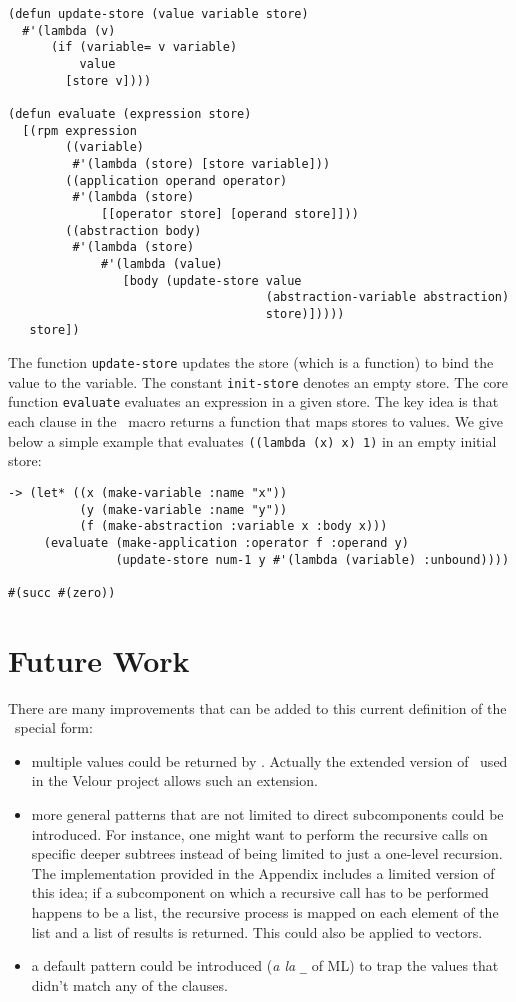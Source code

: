 \begin{sloppypar}
\begin{verbatim}
(defun update-store (value variable store)
  #'(lambda (v)
      (if (variable= v variable)
          value
        [store v])))

(defun evaluate (expression store)
  [(rpm expression
        ((variable)
         #'(lambda (store) [store variable]))
        ((application operand operator)
         #'(lambda (store)
             [[operator store] [operand store]]))
        ((abstraction body)
         #'(lambda (store)
             #'(lambda (value)
                [body (update-store value
                                    (abstraction-variable abstraction)
                                    store)]))))
   store])
\end{verbatim}
The function {\tt update-store} updates the store (which is a function)
to bind the value to the variable. The constant {\tt init-store}
denotes an empty store.  The core function {\tt evaluate} evaluates an
expression in a given store. The key idea is that each clause in the
\rpm\  macro returns a function that maps stores to values. We
give below a simple example that evaluates {\tt ((lambda (x) x) 1)} in
an empty initial store:
\begin{verbatim}
-> (let* ((x (make-variable :name "x"))
          (y (make-variable :name "y"))
          (f (make-abstraction :variable x :body x)))
     (evaluate (make-application :operator f :operand y)
               (update-store num-1 y #'(lambda (variable) :unbound))))

#(succ #(zero))
\end{verbatim}

\section{Future Work}

There are many improvements that can be added to this current
definition of the \rpm\ special form: 
\begin{itemize}
\item
	multiple values could be returned by \rpm. Actually the extended
version of \rpm\ used in the Velour project allows such an extension.
\item
	more general patterns that are not limited to direct
subcomponents could be introduced. For instance, one might want to
perform the recursive calls on specific deeper subtrees instead of
being limited to just a one-level recursion. The implementation
provided in the Appendix includes a limited version of this idea; if a
subcomponent on which a recursive call has to be performed happens to
be a list, the recursive process is mapped on each element of the list
and a list of results is returned. This could also be applied to
vectors.
\item
	a default pattern could be introduced ({\em a la} {\tt \_} of
ML) to trap the values that didn't match any of the clauses.
\end{itemize}


\end{sloppypar}
